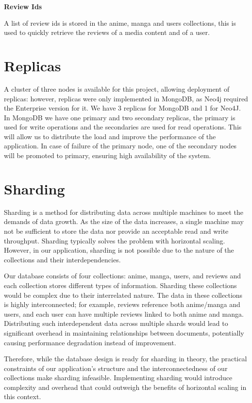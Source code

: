 \textbf{Review Ids}


A list of review ids is stored in the anime, manga and users collections, this is used to quickly retrieve the reviews of a media content and of a user.

\section{Replicas}
A cluster of three nodes is available for this project, allowing deployment of replicas: however, replicas were only implemented in MongoDB, as Neo4j required the Enterprise version for it.
We have 3 replicas for MongoDB and 1 for Neo4J.
In MongoDB we have one primary and two secondary replicas, the primary is used for write operations and the secondaries are used for read operations. This will allow us to distribute the load and improve the performance of the application. In case of failure of the primary node, one of the secondary nodes will be promoted to primary, ensuring high availability of the system.

\newpage
\section{Sharding}
Sharding is a method for distributing data across multiple machines to meet the demands of data growth. As the size of the data increases, a single machine may not be sufficient to store the data nor provide an acceptable read and write throughput. Sharding typically solves the problem with horizontal scaling. However, in our application, sharding is not possible due to the nature of the collections and their interdependencies.

Our database consists of four collections: anime, manga, users, and reviews and each collection stores different types of information.
Sharding these collections would be complex due to their interrelated nature. The data in these collections is highly interconnected; for example, reviews reference both anime/manga and users, and each user can have multiple reviews linked to both anime and manga. Distributing such interdependent data across multiple shards would lead to significant overhead in maintaining relationships between documents, potentially causing performance degradation instead of improvement.

Therefore, while the database design is ready for sharding in theory, the practical constraints of our application's structure and the interconnectedness of our collections make sharding infeasible. Implementing sharding would introduce complexity and overhead that could outweigh the benefits of horizontal scaling in this context.

